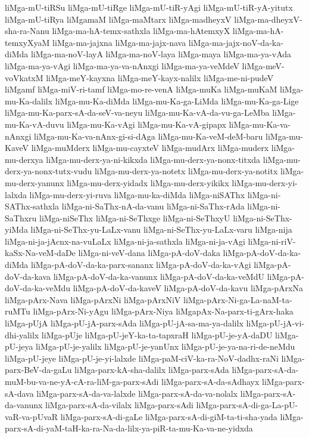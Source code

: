 {liMga-mU-tiRSu
liMga-mU-tiRge
liMga-mU-tiR-yAgi
liMga-mU-tiR-yA-yitutx
liMga-mU-tiRya
liMgamaM
liMga-maMtarx
liMga-madheyxV
liMga-ma-dheyxV-sha-ra-Nanu
liMga-ma-hA-temx-sathxla
liMga-ma-hAtemxyX
liMga-ma-hA-temxyXyaM
liMga-ma-jajxna
liMga-ma-jajx-nava
liMga-ma-jajx-noV-da-ka-diMda
liMga-ma-noV-layA
liMga-ma-noV-laya
liMga-maya
liMga-ma-ya-vAda
liMga-ma-ya-vAgi
liMga-ma-ya-va-nAnxgi
liMga-ma-ya-veMdeV
liMga-meV-voVkatxM
liMga-meY-kayxna
liMga-meY-kayx-nalilx
liMga-me-ni-pudeV
liMgamf
liMga-miV-ri-tamf
liMga-mo-re-venA
liMga-muKa
liMga-muKaM
liMga-mu-Ka-dalilx
liMga-mu-Ka-diMda
liMga-mu-Ka-ga-LiMda
liMga-mu-Ka-ga-Lige
liMga-mu-Ka-parx-sA-da-seV-va-neyu
liMga-mu-Ka-vA-da-vu-ga-LeMba
liMga-mu-Ka-vA-duvu
liMga-mu-Ka-vAgi
liMga-mu-Ka-vA-gipapx
liMga-mu-Ka-va-nAnxgi
liMga-mu-Ka-va-nAnx-gi-si-dAga
liMga-mu-Ka-veM-deM-baru
liMga-mu-KaveV
liMga-muMderx
liMga-mu-cayxteV
liMga-mudArx
liMga-muderx
liMga-mu-derxya
liMga-mu-derx-ya-ni-kikxda
liMga-mu-derx-ya-nonx-titxda
liMga-mu-derx-ya-nonx-tutx-vudu
liMga-mu-derx-ya-notetx
liMga-mu-derx-ya-notitx
liMga-mu-derx-yanunx
liMga-mu-derx-yidadx
liMga-mu-derx-yikikx
liMga-mu-derx-yi-lalxda
liMga-mu-derx-yi-ruva
liMga-mu-ka-diMda
liMga-niSAThx
liMga-ni-SAThx-sathxla
liMga-ni-SaThx-nA-da-vanu
liMga-ni-SaThx-rAda
liMga-ni-SaThxru
liMga-niSeThx
liMga-ni-SeThxge
liMga-ni-SeThxyU
liMga-ni-SeThx-yiMda
liMga-ni-SeThx-yu-LaLx-vanu
liMga-ni-SeThx-yu-LaLx-varu
liMga-nija
liMga-ni-ja-jAcnx-na-vuLaLx
liMga-ni-ja-sathxla
liMga-ni-ja-vAgi
liMga-ni-riV-kaSx-Na-veM-daDe
liMga-ni-veV-dana
liMga-pA-doV-daka
liMga-pA-doV-da-ka-diMda
liMga-pA-doV-da-ka-parx-sananx
liMga-pA-doV-da-ka-vAgi
liMga-pA-doV-da-kava
liMga-pA-doV-da-ka-vanunx
liMga-pA-doV-da-ka-veMdU
liMga-pA-doV-da-ka-veMdu
liMga-pA-doV-da-kaveV
liMga-pA-doV-da-kavu
liMga-pArxNa
liMga-pArx-Nava
liMga-pArxNi
liMga-pArxNiV
liMga-pArx-Ni-ga-La-naM-ta-ruMTu
liMga-pArx-Ni-yAgu
liMga-pArx-Niya
liMgapAx-Na-parx-ti-gArx-haka
liMga-pUjA
liMga-pU-jA-parx-sAda
liMga-pU-jA-sa-ma-ya-dalilx
liMga-pU-jA-vi-dhi-yalilx
liMga-pUje
liMga-pU-jeY-ka-ta-tapxraH
liMga-pU-je-yA-daDU
liMga-pU-jeya
liMga-pU-je-yalilx
liMga-pU-je-yanUnx
liMga-pU-je-ya-na-ri-de-neMdu
liMga-pU-jeye
liMga-pU-je-yi-lalxde
liMga-paM-ciV-ka-ra-NoV-dadhx-raNi
liMga-parx-BeV-da-gaLu
liMga-parx-kA-sha-dalilx
liMga-parx-sAda
liMga-parx-sA-da-muM-bu-va-ne-yA-cA-ra-liM-ga-parx-sAdi
liMga-parx-sA-da-sAdhayx
liMga-parx-sA-dava
liMga-parx-sA-da-va-lalxde
liMga-parx-sA-da-va-nolalx
liMga-parx-sA-da-vanunx
liMga-parx-sA-da-vilalx
liMga-parx-sAdi
liMga-parx-sA-di-ga-La-pU-vaR-va-pUvaR
liMga-parx-sA-di-gaLe
liMga-parx-sA-di-giM-ta-ti-sha-yada
liMga-parx-sA-di-yaM-taH-ka-ra-Na-da-lilx-ya-piR-ta-mu-Ka-va-ne-yidxda
}
